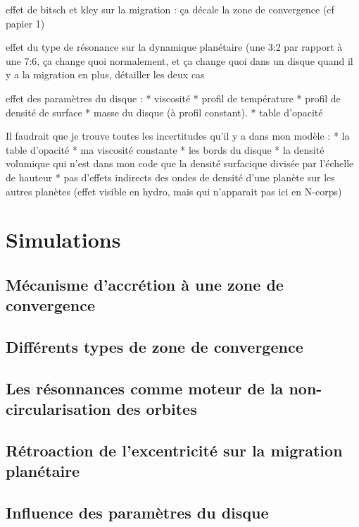 \documentclass[a4paper,twoside]{article}
\begin{document}
effet de bitsch et kley sur la migration : ça décale la zone de convergence (cf papier 1)

effet du type de résonance sur la dynamique planétaire (une 3:2 par rapport à une 7:6, ça change quoi normalement, et ça change quoi dans un disque quand il y a la migration en plus, détailler les deux cas



effet des paramètres du disque : 
* viscosité
* profil de température
* profil de densité de surface
* masse du disque (à profil constant). 
* table d'opacité

Il faudrait que je trouve toutes les incertitudes qu'il y a dans mon modèle : 
* la table d'opacité
* ma viscosité constante
* les bords du disque
* la densité volumique qui n'est dans mon code que la densité surfacique divisée par l'échelle de hauteur
* pas d'effets indirects des ondes de densité d'une planète sur les autres planètes (effet visible en hydro, mais qui n'apparait pas ici en N-corps)

\chapter{Simulations}
\section{Mécanisme d'accrétion à une zone de convergence}

\section{Différents types de zone de convergence}

\section{Les résonnances comme moteur de la non-circularisation des orbites}

\section{Rétroaction de l'excentricité sur la migration planétaire}

\section{Influence des paramètres du disque}
\end{document}
